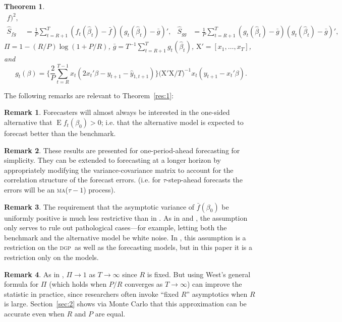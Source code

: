 \documentclass[12pt]{article}
\newtheorem{thm}{Theorem}
\theoremstyle{definition}
\newtheorem{rem}{Remark}
\DeclareMathOperator{\E}{E}
\newcommand{\X}{\ensuremath{\mathrm{X}}}
\newcommand{\dgp}{\textsc{dgp}}
\newcommand{\ma}{\textsc{ma}}
\begin{document}
\begin{thm}
\begin{align*}
    f)^2, \\
    \hat{S}_{fg} &= \frac1P \sum_{t=R+1}^T (f_t(\hat{\beta}_t) -
    \bar{f})(g_t(\hat{\beta}_t) - \bar g)', &
    \hat{S}_{gg} &= \frac1P \sum_{t=R+1}^T (g_t(\hat{\beta}_t) - \bar
    g)(g_t(\hat{\beta}_t) - \bar g)',
  \end{align*}
  $\Pi = 1 - (R/P) \log(1 + P/R)$, $\bar{g} = T^{-1}
  \sum_{t=R+1}^T g_t(\hat{\beta}_t)$, $\X' = [x_1,\dots,x_T]$, and
  \begin{equation*}
  g_t(\beta) = \Bigg\{\frac{2}{P}\sum_{t=R}^{T-1} x_t (2 x_t'\beta -
    y_{t+1} - \hat{y}_{1,t+1}) \Bigg\} \big(\X'\X / T \big)^{-1}  x_t(y_{t+1} - x_t'\beta).
  \end{equation*}
\end{thm}

The following remarks are relevant to Theorem~\ref{res:1}:

\begin{rem}
  Forecasters will almost always be interested in the one-sided
  alternative that $\E f_t(\beta_0) > 0$; i.e. that the alternative
  model is expected to forecast better than the benchmark.
\end{rem}

\begin{rem}
  These results are presented for one-period-ahead forecasting for
  simplicity.  They can be extended to forecasting at a longer horizon
  by appropriately modifying the variance-covariance matrix to account
  for the correlation structure of the forecast errors. (i.e. for
  $\tau$-step-ahead forecasts the errors will be an \ma($\tau-1$) process).
\end{rem}

\begin{rem}
  The requirement that the asymptotic variance of $\bar f(\beta_0)$ be
  uniformly positive is much less restrictive than in \cite{Wes:96}.
  As in \cite{GiW:06} and \citet{ClW:06,ClW:07}, the assumption only
  serves to rule out pathological cases---for example, letting both
  the benchmark and the alternative model be white noise. In
  \citet{Wes:96}, this assumption is a restriction on the \dgp\ as
  well as the forecasting models, but in this paper it is a
  restriction only on the models.
\end{rem}

\begin{rem}
  As in \citet{Wes:96}, $\Pi \to 1$ as $T \to \infty$ since $R$ is
  fixed.  But using West's general formula for $\Pi$ (which holds when
  $P/R$ converges as $T \to \infty$) can improve the statistic in
  practice, since researchers often invoke ``fixed $R$'' asymptotics
  when $R$ is large.  Section~\ref{sec:2} shows via Monte Carlo that
  this approximation can be accurate even when $R$ and $P$ are equal.
\end{rem}
\end{document}

